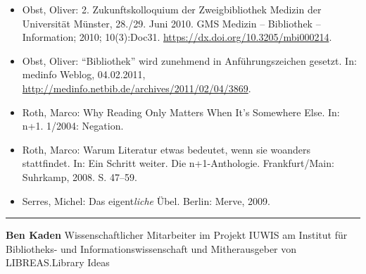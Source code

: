 \documentclass[output=paper]{langscibook}
\begin{document}
\begin{itemize}
\item Obst, Oliver: 2. Zukunftskolloquium der Zweigbibliothek Medizin der Universität Münster, 28./29. Juni 2010. GMS Medizin -- Bibliothek -- Information; 2010; 10(3):Doc31.  \url{https://dx.doi.org/10.3205/mbi000214}.

\item Obst, Oliver: \enquote{Bibliothek} wird zunehmend in Anführungszeichen
gesetzt. In: medinfo Weblog, 04.02.2011,
\url{http://medinfo.netbib.de/archives/2011/02/04/3869}.

\item Roth, Marco: Why Reading Only Matters When It's Somewhere Else. In: n+1. 1/2004: Negation.

\item Roth, Marco: Warum Literatur etwas bedeutet, wenn sie woanders stattfindet. In: Ein Schritt weiter. Die n+1-Anthologie. Frankfurt/Main:
Suhrkamp, 2008. S. 47--59.

\item Serres, Michel: Das eigent\emph{liche} Übel. Berlin: Merve, 2009.
\end{itemize}

\begin{center}\rule{0.5\linewidth}{0.5pt}\end{center}


\textbf{Ben Kaden} Wissenschaftlicher Mitarbeiter im Projekt IUWIS am
Institut für Bibliotheks- und Informationswissenschaft und
Mitherausgeber von LIBREAS.Library Ideas

\end{document}
